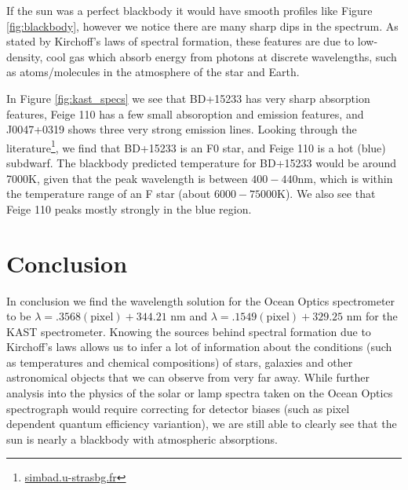 \documentclass[preprint]{aastex62}
\begin{document}
If the sun was a perfect blackbody it would have smooth profiles like Figure \ref{fig:blackbody}, however we notice there are many sharp dips in the spectrum. As stated by Kirchoff's laws of spectral formation, these features are due to low-density, cool gas which absorb energy from photons at discrete wavelengths, such as atoms/molecules in the atmosphere of the star and Earth.

In Figure \ref{fig:kast_specs} we see that BD+15233 has very sharp absorption features, Feige 110 has a few small absoroption and emission features, and J0047+0319 shows three very strong emission lines. Looking through the literature\footnote{\href{simbad.u-strasbg.fr}{simbad.u-strasbg.fr}}, we find that BD+15233 is an F0 star, and Feige 110 is a hot (blue) subdwarf. The blackbody predicted temperature for BD+15233 would be around 7000K, given that the peak wavelength is between $400-440$nm, which is within the temperature range of an F star (about $6000-75000$K). We also see that Feige 110 peaks mostly strongly in the blue region.

\section{Conclusion}
In conclusion we find the wavelength solution for the Ocean Optics spectrometer to be $\lambda=.3568(\mathrm{pixel})+344.21$ nm and  $\lambda=.1549(\mathrm{pixel})+329.25$ nm for the KAST spectrometer.
Knowing the sources behind spectral formation due to Kirchoff's laws allows us to infer a lot of information about the conditions (such as temperatures and chemical compositions) of stars, galaxies and other astronomical objects that we can observe from very far away.
While further analysis into the physics of the solar or lamp spectra taken on the Ocean Optics spectrograph would require correcting for detector biases (such as pixel dependent quantum efficiency variantion), we are still able to clearly see that the sun is nearly a blackbody with atmospheric absorptions.

\end{document}
